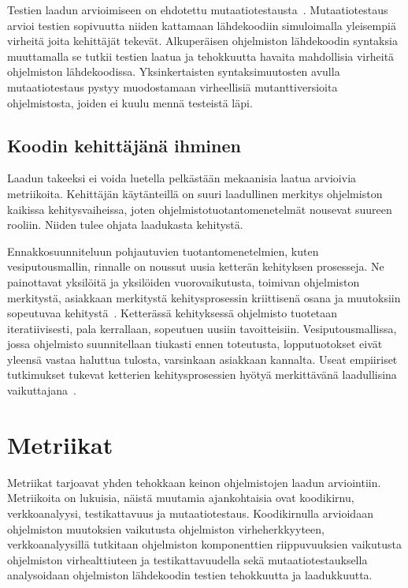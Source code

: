 \documentclass[finnish]{../tktltiki2}
\theoremstyle{definition}
\theoremstyle{remark}
\begin{document}
    Testien laadun arvioimiseen on ehdotettu mutaatiotestausta~\cite{YH11}. Mutaatiotestaus arvioi testien sopivuutta 
niiden kattamaan lähdekoodiin simuloimalla yleisempiä virheitä joita kehittäjät tekevät. Alkuperäisen ohjelmiston 
lähdekoodin syntaksia muuttamalla se tutkii testien laatua ja tehokkuutta havaita mahdollisia virheitä ohjelmiston 
lähdekoodissa. Yksinkertaisten syntaksimuutosten avulla mutaatiotestaus pystyy muodostamaan virheellisiä 
mutanttiversioita ohjelmistosta, joiden ei kuulu mennä testeistä läpi.

\subsection{Koodin kehittäjänä ihminen}

Laadun takeeksi ei voida luetella pelkästään mekaanisia laatua arvioivia metriikoita. Kehittäjän käytänteillä on suuri 
laadullinen merkitys ohjelmiston kaikissa kehitysvaiheissa, joten ohjelmistotuotantomenetelmät nousevat suureen rooliin. 
Niiden tulee ohjata laadukasta kehitystä.

    Ennakkosuunniteluun pohjautuvien tuotantomenetelmien, kuten vesiputousmallin, rinnalle on noussut uusia ketterän 
kehityksen prosesseja. Ne painottavat yksilöitä ja yksilöiden vuorovaikutusta, toimivan ohjelmiston merkitystä, 
asiakkaan merkitystä kehitysprosessin kriittisenä osana ja muutoksiin sopeutuvaa kehitystä~\cite{BBB01}. Ketterässä 
kehityksessä ohjelmisto tuotetaan iteratiivisesti, pala kerrallaan, sopeutuen uusiin tavoitteisiin. Vesiputousmallissa, 
jossa ohjelmisto suunnitellaan tiukasti ennen toteutusta, lopputuotokset eivät yleensä vastaa haluttua tulosta, 
varsinkaan asiakkaan kannalta. Useat empiiriset tutkimukset tukevat ketterien kehitysprosessien hyötyä merkittävänä 
laadullisina vaikuttajana~\cite{SS10}.

\section{Metriikat}

Metriikat tarjoavat yhden tehokkaan keinon ohjelmistojen laadun arviointiin. Metriikoita on lukuisia, näistä muutamia 
ajankohtaisia ovat koodikirnu, verkkoanalyysi, testikattavuus ja mutaatiotestaus. Koodikirnulla arvioidaan ohjelmiston 
muutoksien vaikutusta ohjelmiston virheherkkyyteen, verkkoanalyysillä tutkitaan ohjelmiston komponenttien riippuvuuksien 
vaikutusta ohjelmiston virhealttiuteen ja testikattavuudella sekä mutaatiotestauksella analysoidaan ohjelmiston 
lähdekoodin testien tehokkuutta ja laadukkuutta.
\end{document}
